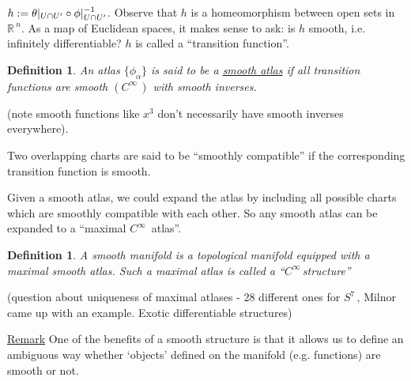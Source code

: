 \documentclass[12pt,a4paper]{article}
\newcommand{\rR}{\ensuremath{\mathbb{R}\,}}
\newcommand{\cinf}{\ensuremath{C^{\infty}\,}}
\newcommand{\sph}[1]{\ensuremath{S^{#1}}\,}
\newcommand{\ul}[1]{\underline{#1}}
\newtheorem{defn}[thm]{Definition}
\begin{document}
\begin{center}
\end{center}

$h:=\theta \large|_{U\cap U'}\circ \phi \large|_{U\cap U'}^{-1}$. Observe that $h$ is a homeomorphism between open sets in $\rR^n$. As a map of Euclidean spaces, it makes sense to ask: is $h$ smooth, i.e. infinitely differentiable? $h$ is called a ``transition function''.

\begin{defn}
An atlas $\{\phi_\alpha\}$ is said to be a \ul{smooth atlas} if all transition functions are smooth $(\cinf)$ with smooth inverses.
\end{defn}

(note smooth functions like $x^3$ don't necessarily have smooth inverses everywhere).

Two overlapping charts are said to be ``smoothly compatible'' if the corresponding transition function is smooth. 

Given a smooth atlas, we could expand the atlas by including all possible charts which are smoothly compatible with each other. So any smooth atlas can be expanded to a ``maximal $\cinf$ atlas''.

\begin{defn}
A smooth manifold is a topological manifold equipped with a maximal smooth atlas. Such a maximal atlas is called a ``\cinf structure''
\end{defn}

(question about uniqueness of maximal atlases - 28 different ones for \sph{7}, Milnor came up with an example. Exotic differentiable structures)
 
\ul{Remark} One of the benefits of a smooth structure is that it allows us to define an ambiguous  way whether `objects' defined on the manifold (e.g. functions) are smooth or not.
\end{document}
